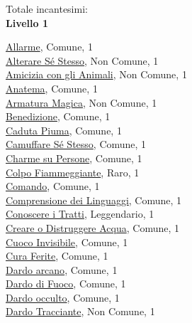\begin{multicols}{3}
{{Totale incantesimi: \theinclvzero\\

\textbf{Livello 1} 

\hyperlink{Allarme}{Allarme}, Comune, 1\\
\hyperlink{Alterare Sé Stesso}{Alterare Sé Stesso}, Non Comune, 1\\
\hyperlink{Amicizia con gli Animali}{Amicizia con gli Animali}, Non Comune, 1\\
\hyperlink{Anatema}{Anatema}, Comune, 1\\
\hyperlink{Armatura Magica}{Armatura Magica}, Non Comune, 1\\
\hyperlink{Benedizione}{Benedizione}, Comune, 1\\
\hyperlink{Caduta Piuma}{Caduta Piuma}, Comune, 1\\
\hyperlink{Camuffare Sé Stesso}{Camuffare Sé Stesso}, Comune, 1\\
\hyperlink{Charme su Persone}{Charme su Persone}, Comune, 1\\
\hyperlink{Colpo Fiammeggiante}{Colpo Fiammeggiante}, Raro, 1\\
\hyperlink{Comando}{Comando}, Comune, 1\\
\hyperlink{Comprensione dei Linguaggi}{Comprensione dei Linguaggi}, Comune, 1\\
\hyperlink{Conoscere i Tratti}{Conoscere i Tratti}, Leggendario, 1\\
\hyperlink{Creare o Distruggere Acqua}{Creare o Distruggere Acqua}, Comune, 1\\
\hyperlink{Cuoco Invisibile}{Cuoco Invisibile}, Comune, 1\\
\hyperlink{Cura Ferite}{Cura Ferite}, Comune, 1\\
\hyperlink{Dardo arcano}{Dardo arcano}, Comune, 1\\
\hyperlink{Dardo di Fuoco}{Dardo di Fuoco}, Comune, 1\\
\hyperlink{Dardo occulto}{Dardo occulto}, Comune, 1\\
\hyperlink{Dardo Tracciante}{Dardo Tracciante}, Non Comune, 1\\
}}
\end{multicols}
